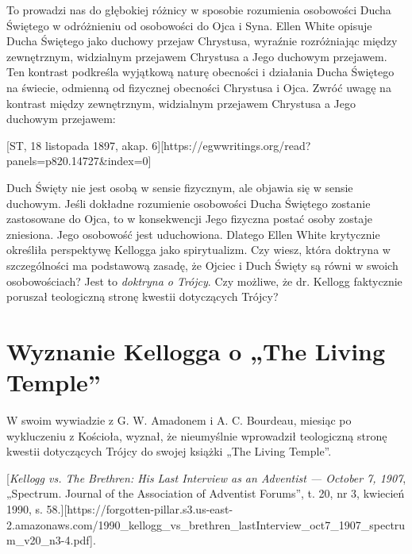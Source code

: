 To prowadzi nas do głębokiej różnicy w sposobie rozumienia osobowości Ducha Świętego w odróżnieniu od osobowości do Ojca i Syna. Ellen White opisuje Ducha Świętego jako duchowy przejaw Chrystusa, wyraźnie rozróżniając między zewnętrznym, widzialnym przejawem Chrystusa a Jego duchowym przejawem. Ten kontrast podkreśla wyjątkową naturę obecności i działania Ducha Świętego na świecie, odmienną od fizycznej obecności Chrystusa i Ojca. Zwróć uwagę na kontrast między zewnętrznym, widzialnym przejawem Chrystusa a Jego duchowym przejawem:

[ST, 18 listopada 1897, akap. 6][https://egwwritings.org/read?panels=p820.14727&index=0]

Duch Święty nie jest osobą w sensie fizycznym, ale objawia się w sensie duchowym. Jeśli dokładne rozumienie osobowości Ducha Świętego zostanie zastosowane do Ojca, to w konsekwencji Jego fizyczna postać osoby zostaje zniesiona. Jego osobowość jest uduchowiona. Dlatego Ellen White krytycznie określiła perspektywę Kellogga jako spirytualizm. Czy wiesz, która doktryna w szczególności ma podstawową zasadę, że Ojciec i Duch Święty są równi w swoich osobowościach? Jest to \textit{doktryna o Trójcy}. Czy możliwe, że dr. Kellogg faktycznie poruszał teologiczną stronę kwestii dotyczących Trójcy?

\section*{Wyznanie Kellogga o „The Living Temple”}

W swoim wywiadzie z G. W. Amadonem i A. C. Bourdeau, miesiąc po wykluczeniu z Kościoła, wyznał, że nieumyślnie wprowadził teologiczną stronę kwestii dotyczących Trójcy do swojej książki „The Living Temple”.

[\textit{Kellogg vs. The Brethren: His Last Interview as an Adventist — October 7, 1907}, „Spectrum. Journal of the Association of Adventist Forums”, t. 20, nr 3, kwiecień 1990, s. 58.][https://forgotten-pillar.s3.us-east-2.amazonaws.com/1990\_kellogg\_vs\_brethren\_lastInterview\_oct7\_1907\_spectrum\_v20\_n3-4.pdf].

